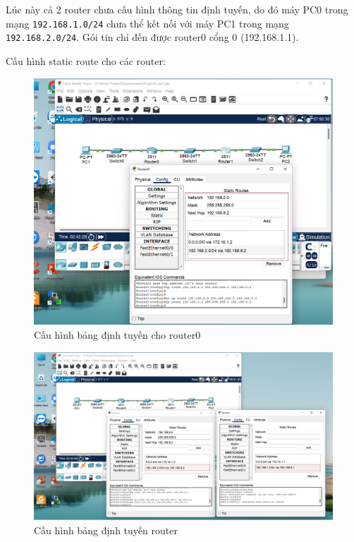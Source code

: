 \begin{enumerate}
Lúc này cả 2 router chưa cấu hình thông tin định tuyến, do đó máy PC0 trong mạng \texttt{192.168.1.0/24} chưa thể kết nối với máy PC1 trong mạng \texttt{192.168.2.0/24}. Gói tin chỉ đến được router0 cổng 0 (192.168.1.1).

Cấu hình static route cho các router:

\begin{figure}[H]
\begin{center}
\includegraphics[scale=0.4]{../figures/p1/p1-4a}
\end{center}
\caption{Cấu hình bảng định tuyến cho router0}
\end{figure}

\begin{figure}[H]
\begin{center}
\includegraphics[scale=0.4]{../figures/p1/p1-4b}
\end{center}
\caption{Cấu hình bảng định tuyến router}
\end{figure}


\end{enumerate}
